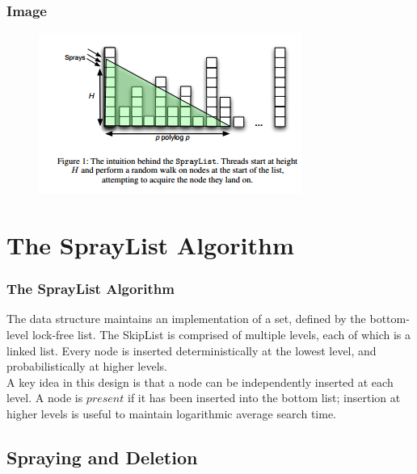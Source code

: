 \documentclass{beamer}
\begin{document}
\begin{frame}
\frametitle{Image}
\begin{figure}
\includegraphics[width=0.8\linewidth]{SL1}
\end{figure}
\end{frame}


\section{The SprayList Algorithm}

\begin{frame}	
\frametitle{The SprayList Algorithm}
The data structure maintains an implementation of a set, defined by the bottom-level lock-free list. The SkipList is comprised of multiple levels,
each of which is a linked list. Every node is inserted deterministically
at the lowest level, and probabilistically at higher levels.\\
A key idea
in this design is that a node can be independently inserted at each
level. A node is $present$ if it has been inserted into the bottom list;
insertion at higher levels is useful to maintain logarithmic average
search time.

\end{frame}



\subsection{Spraying and Deletion}
\end{document}
